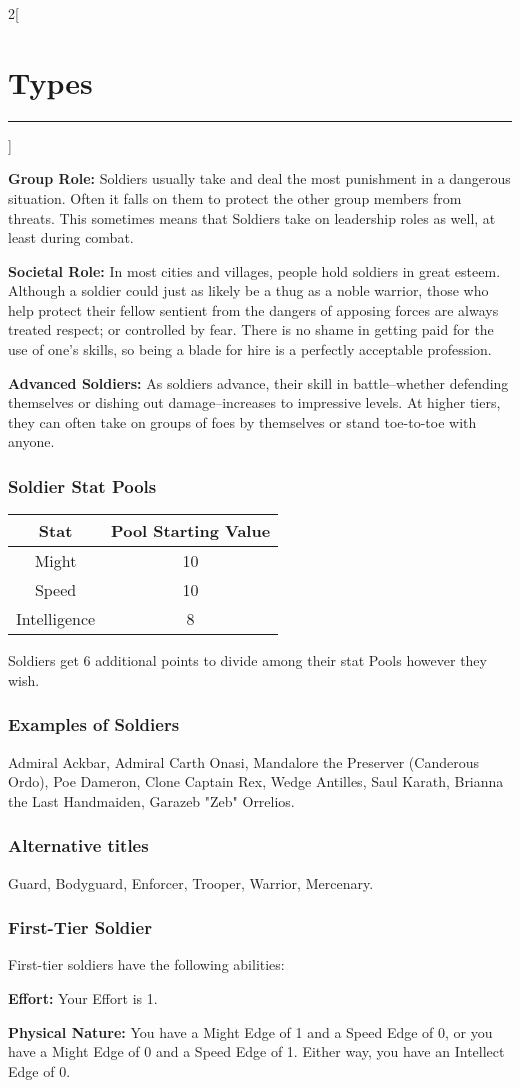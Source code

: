 \documentclass[a4paper,10pt,final]{book}
\newcommand{\HRule}{\rule{\linewidth}{0.5mm}} %
\newcommand{\newSection}[1]{\section*{#1} \addcontentsline{toc}{section}{#1} \label{sec:#1} \HRule}
\newcommand{\statPool}[5]
{
	\subsubsection*{#1 Stat Pools}
	\label{subsub:#1StatPools}
	\begin{center}
	\begin{tabular}{ |c|c| }
	\hline
	\textbf{Stat} & \textbf{Pool Starting Value} \\
	\hline \hline
	Might & #2 \\
	\hline
 	Speed & #3  \\
 	\hline
 	Intelligence & #4  \\
 	\hline
	\end{tabular}
	\end{center}
	#1s get #5 additional points to divide among their stat Pools however they wish.
}
\newcommand{\itemLine}[2]{\textbf{#1:} {#2}\par}
\newenvironment{docsection}[1]
{
  \begin{multicols*}{2}[\newSection{#1}]
}
{
  \end{multicols*}
  \newpage
}
\begin{document}
\begin{docsection}{Types}
\itemLine{Group Role} {Soldiers usually take and deal the most punishment in a dangerous situation. Often it falls on them to protect the other group members from threats. This sometimes means that Soldiers take on leadership roles as well, at least during combat.}

\itemLine{Societal Role} {In most cities and villages, people hold soldiers in great esteem. Although a soldier could just as likely be a thug as a noble warrior, those who help protect their fellow sentient from the dangers of apposing forces are always treated respect; or controlled by fear. There is no shame in getting paid for the use of one’s skills, so being a blade for hire is a perfectly acceptable profession.}

\itemLine{Advanced Soldiers} {As soldiers advance, their skill in battle--whether defending themselves or dishing out damage--increases to impressive levels. At higher tiers, they can often take on groups of foes by themselves or stand toe-to-toe with anyone.}

\statPool{Soldier}{10}{10}{8}{6}

\subsubsection*{Examples of Soldiers}
\label{subsub:soldierExamples}

Admiral Ackbar, Admiral Carth Onasi, Mandalore the Preserver (Canderous Ordo), Poe Dameron, Clone Captain Rex, Wedge Antilles, Saul Karath, Brianna the Last Handmaiden, Garazeb "Zeb" Orrelios.

\subsubsection*{Alternative titles}
\label{subsub:soldierAlternative}

Guard, Bodyguard, Enforcer, Trooper, Warrior, Mercenary.


\subsubsection*{First-Tier Soldier}
\label{subsub:soldierFirstTier}

First-tier soldiers have the following abilities:

\itemLine{Effort} {Your Effort is 1.}

\itemLine{Physical Nature} {You have a Might Edge
of 1 and a Speed Edge of 0, or you have a
Might Edge of 0 and a Speed Edge of 1.
Either way, you have an Intellect Edge of 0.}


\end{docsection}
\end{document}
